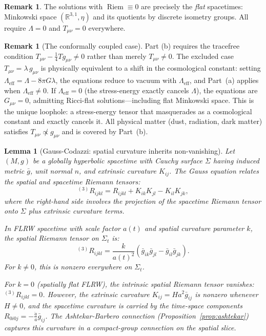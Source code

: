\documentclass[12pt]{amsart}
\newtheorem{lemma}[theorem]{Lemma}
\theoremstyle{definition}
\newtheorem{remark}[theorem]{Remark}
\newcommand{\R}{\mathbb{R}}
\newcommand{\Riem}{\operatorname{Riem}}
\begin{document}
\begin{remark}
The solutions with $\Riem \equiv 0$ are precisely the \emph{flat} spacetimes: Minkowski space $(\R^{3,1}, \eta)$ and its quotients by discrete isometry groups.  All require $\Lambda = 0$ and $T_{\mu\nu} = 0$ everywhere.
\end{remark}

\begin{remark}[The conformally coupled case]
Part (b) requires the tracefree condition $T_{\mu\nu} - \frac{1}{4}Tg_{\mu\nu} \neq 0$ rather than merely $T_{\mu\nu} \neq 0$.  The excluded case $T_{\mu\nu} = \lambda\,g_{\mu\nu}$ is physically equivalent to a shift in the cosmological constant: setting $\Lambda_{\mathrm{eff}} = \Lambda - 8\pi G\lambda$, the equations reduce to vacuum with $\Lambda_{\mathrm{eff}}$, and Part~(a) applies when $\Lambda_{\mathrm{eff}} \neq 0$.  If $\Lambda_{\mathrm{eff}} = 0$ (the stress-energy exactly cancels $\Lambda$), the equations are $G_{\mu\nu} = 0$, admitting Ricci-flat solutions---including flat Minkowski space.  This is the unique loophole: a stress-energy tensor that masquerades as a cosmological constant and exactly cancels it.  All physical matter (dust, radiation, dark matter) satisfies $T_{\mu\nu} \not\propto g_{\mu\nu}$ and is covered by Part~(b).
\end{remark}

\begin{lemma}[Gauss-Codazzi: spatial curvature inherits non-vanishing]
\label{lem:gauss}
Let $(M, g)$ be a globally hyperbolic spacetime with Cauchy surface $\Sigma$ having induced metric $\bar{g}$, unit normal $n$, and extrinsic curvature $K_{ij}$.  The Gauss equation relates the spatial and spacetime Riemann tensors:
\[
{}^{(3)}R_{ijkl} = R_{ijkl} + K_{ik}K_{jl} - K_{il}K_{jk},
\]
where the right-hand side involves the projection of the spacetime Riemann tensor onto $\Sigma$ plus extrinsic curvature terms.  

In FLRW spacetime with scale factor $a(t)$ and spatial curvature parameter $k$, the spatial Riemann tensor on $\Sigma_t$ is:
\[
{}^{(3)}R_{ijkl} = \frac{k}{a(t)^2}(\bar{g}_{ik}\bar{g}_{jl} - \bar{g}_{il}\bar{g}_{jk}).
\]
For $k \neq 0$, this is nonzero everywhere on $\Sigma_t$.

For $k = 0$ (spatially flat FLRW), the intrinsic spatial Riemann tensor vanishes: ${}^{(3)}R_{ijkl} = 0$.  However, the extrinsic curvature $K_{ij} = Ha^2\bar{g}_{ij}$ is nonzero whenever $H \neq 0$, and the spacetime curvature is carried by the time-space components $R_{0i0j} = -\frac{\ddot{a}}{a}\bar{g}_{ij}$.  The Ashtekar-Barbero connection (Proposition~\ref{prop:ashtekar}) captures this curvature in a compact-group connection on the spatial slice.
\end{lemma}
\end{document}
